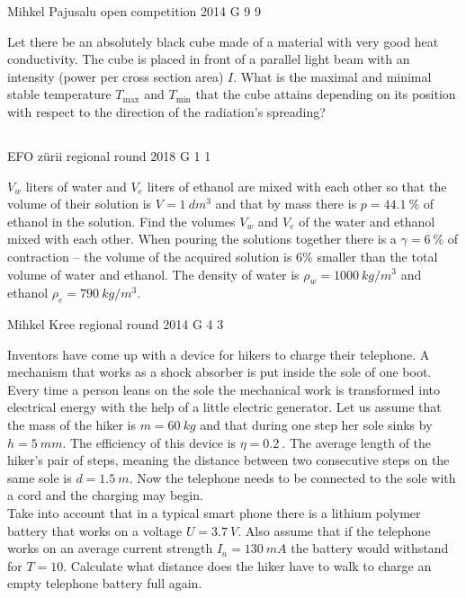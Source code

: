 \documentclass[11pt]{article}
\begin{document}
{Mihkel Pajusalu} %
{open competition} %
{2014} %
{G 9} %
{9} %
{

\ifEngStatement
Let there be an absolutely black cube made of a material with very good heat conductivity. The cube is placed in front of a parallel light beam with an intensity (power per cross section area) $I$. What is the maximal and minimal stable temperature $T_\text{max}$ and $T_\text{min}$ that the cube attains depending on its position with respect to the direction of the radiation’s spreading?
\fi
}
\newpage\subsection{\protect{}}

{EFO zürii} %
{regional round} %
{2018} %
{G 1} %
{1} %
{

\ifEngStatement
$V_w$ liters of water and $V_e$ liters of ethanol are mixed with each other so that the volume of their solution is $V=\SI{1}{dm^3}$ and that by mass there is $p=\SI{44,1}{\percent}$ of ethanol in the solution. Find the volumes $V_w$ and $V_e$ of the water and ethanol mixed with each other. When pouring the solutions together there is a $\gamma = \SI{6}{\percent}$ of contraction – the volume of the acquired solution is 6\% smaller than the total volume of water and ethanol. The density of water is $\rho_w=\SI{1000}{kg/m^3}$ and ethanol $\rho_e=\SI{790}{kg/m^3}$.
\fi
}

{Mihkel Kree} %
{regional round} %
{2014} %
{G 4} %
{3} %
{

\ifEngStatement
Inventors have come up with a device for hikers to charge their telephone. A mechanism that works as a shock absorber is put inside the sole of one boot. Every time a person leans on the sole the mechanical work is transformed into electrical energy with the help of a little electric generator. Let us assume that the mass of the hiker is $m=\SI{60}{kg}$ and that during one step her sole sinks by $h=\SI{5}{mm}$. The efficiency of this device is $\eta = \SI{0,2}{}$. The average length of the hiker’s pair of steps, meaning the distance between two consecutive steps on the same sole is $d=\SI{1.5}{m}$. Now the telephone needs to be connected to the sole with a cord and the charging may begin.\\
Take into account that in a typical smart phone there is a lithium polymer battery that works on a voltage $U=\SI{3.7}{V}$. Also assume that if the telephone works on an average current strength $I_a=\SI{130}{mA}$ the battery would withstand for $T=10$. Calculate what distance does the hiker have to walk to charge an empty telephone battery full again.
\fi
}
\end{document}
